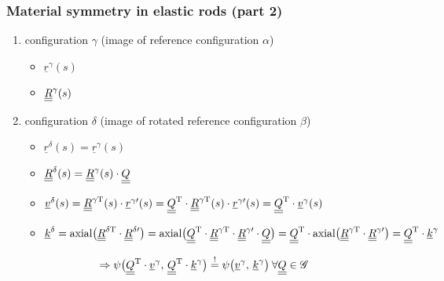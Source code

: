 \begin{frame}
  \frametitle{Material symmetry in elastic rods (part 2)}

  \begin{enumerate}
    \item configuration $\gamma$ (image of reference configuration $\alpha$)
      \begin{itemize}
        \item $\underline{r}^{\gamma}(s)$
        \item $\underline{\underline{R}}^{\gamma}(s)$
      \end{itemize}
    \item configuration $\delta$ (image of rotated reference configuration $\beta$)
      \begin{itemize}
        \item $\underline{r}^{\delta}(s) =
                \underline{r}^{\gamma}(s)$
        \item $\underline{\underline{R}}^{\delta}(s) =
                \underline{\underline{R}}^{\gamma}(s) \cdot \underline{\underline{Q}}$
        \item $\underline{v}^{\delta}(s) =
                \underline{\underline{R}}^{\gamma \mathrm{T}}(s) \cdot \underline{r}^{\gamma \prime}(s) =
                \underline{\underline{Q}}^{\mathrm{T}} \cdot \underline{\underline{R}}^{\gamma \mathrm{T}}(s) \cdot \underline{r}^{\gamma \prime}(s) =
                \underline{\underline{Q}}^{\mathrm{T}} \cdot \underline{v}^{\gamma}(s)$
        \item $\underline{k}^{\delta} =
                \mathrm{axial} \bigl( \underline{\underline{R}}^{\delta \mathrm{T}} \cdot \underline{\underline{R}}^{\delta \prime} \bigr) =
                \mathrm{axial} \bigl( \underline{\underline{Q}}^{\mathrm{T}} \cdot \underline{\underline{R}}^{\gamma \mathrm{T}} \cdot \underline{\underline{R}}^{\gamma \prime} \cdot \underline{\underline{Q}} \bigr) =
                \underline{\underline{Q}}^{\mathrm{T}} \cdot \mathrm{axial} \bigl( \underline{\underline{R}}^{\gamma \mathrm{T}} \cdot \underline{\underline{R}}^{\gamma \prime} \bigr) =
                \underline{\underline{Q}}^{\mathrm{T}} \cdot \underline{k}^{\gamma}$
      \end{itemize}
  \end{enumerate}
  
  \begin{displaymath}
    \Rightarrow
    \psi \bigl( \underline{\underline{Q}}^{\mathrm{T}} \cdot \underline{v}^{\gamma}, \, \underline{\underline{Q}}^{\mathrm{T}} \cdot \underline{k}^{\gamma} \bigr) \overset{!}{=}
    \psi \bigl( \underline{v}^{\gamma}, \, \underline{k}^{\gamma} \bigr)
    \: \forall \underline{\underline{Q}} \in \mathscr{G}
  \end{displaymath}
  

\end{frame}
